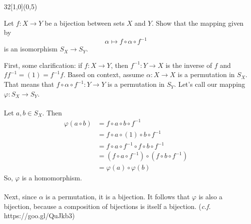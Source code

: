 \documentclass[12pt]{article}
\newenvironment{exercise}[2]{\begin{textblock}{32}[1,0](0,#2)\noindent#1\end{textblock}}{\vspace{1in}}
\begin{document}
\begin{exercise}{1.39}{5}
	{\noindent}Let $f : X\to Y$ be a bijection between sets $X$ and $Y$. Show that the mapping given by \[\alpha \mapsto f\circ\alpha\circ f^{-1}\]
	is an isomorphism $S_X\to S_Y$.
	\bigskip

	{\noindent}First, some clarification: if $f:X\to Y$, then $f^{-1}:Y\to X$ is the inverse of $f$ and $ff^{-1}=(1)=f^{-1}f$.
	Based on context, assume $\alpha:X\to X$ is a permutation in $S_X$. That means that $f\circ\alpha\circ f^{-1}:Y\to Y$ is a
	permutation in $S_Y$. Let's call our mapping $\varphi:S_X\to S_Y$.\\
	\\
	Let $a,b\in S_X$. Then
	\begin{align*}
		\varphi(a\circ b) &= f\circ a\circ b\circ f^{-1} \\
		                  &= f\circ a\circ(1)\circ b\circ f^{-1} \\
											&= f\circ a\circ f^{-1}\circ f\circ b\circ f^{-1} \\
											&= (f\circ a\circ f^{-1})\circ(f\circ b\circ f^{-1}) \\
											&= \varphi(a)\circ\varphi(b)
	\end{align*}
	So, $\varphi$ is a homomorphism.\\
	\\
	Next, since $\alpha$ is a permutation, it is a bijection. It follows that $\varphi$ is also a bijection, because a composition of bijections is
	itself a bijection. ({\small{\textit{c.f.} https://goo.gl/QuJkb3}})\\
	\\
\end{exercise}
\end{document}
